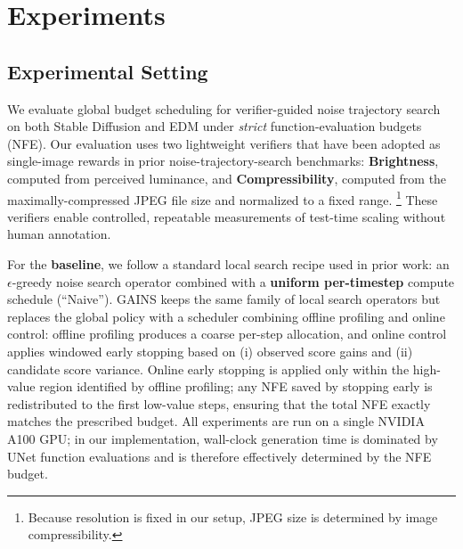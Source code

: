 \section{Experiments}
\label{sec:experiments}

\subsection{Experimental Setting}
\label{sec:exp-setting}
We evaluate global budget scheduling for verifier-guided noise trajectory search on both Stable Diffusion and EDM under \emph{strict} function-evaluation budgets (NFE).
Our evaluation uses two lightweight verifiers that have been adopted as single-image rewards in prior noise-trajectory-search benchmarks: \textbf{Brightness}, computed from perceived luminance, and \textbf{Compressibility}, computed from the maximally-compressed JPEG file size and normalized to a fixed range.%
\footnote{Because resolution is fixed in our setup, JPEG size is determined by image compressibility.}
These verifiers enable controlled, repeatable measurements of test-time scaling without human annotation.

For the \textbf{baseline}, we follow a standard local search recipe used in prior work: an $\epsilon$-greedy noise search operator combined with a \textbf{uniform per-timestep} compute schedule (``Naive'').
GAINS keeps the same family of local search operators but replaces the global policy with a scheduler combining offline profiling and online control: offline profiling produces a coarse per-step allocation, and online control applies windowed early stopping based on (i) observed score gains and (ii) candidate score variance.
Online early stopping is applied only within the high-value region identified by offline profiling; any NFE saved by stopping early is redistributed to the first low-value steps, ensuring that the total NFE exactly matches the prescribed budget.
All experiments are run on a single NVIDIA A100 GPU; in our implementation, wall-clock generation time is dominated by UNet function evaluations and is therefore effectively determined by the NFE budget.

